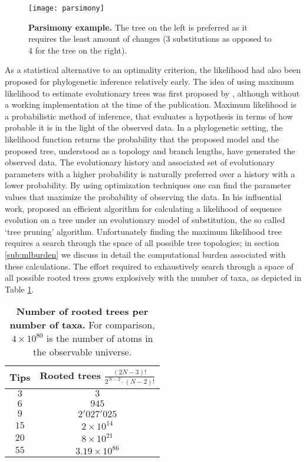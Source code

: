 \begin{figure}[H]
\centering
\texttt{[image: parsimony]} 
\caption{
{ \footnotesize 
{\bf Parsimony example.} The tree on the left is preferred as it requires the least amount of changes (3 substitutions as opposed to 4 for the tree on the right).
}%
}
\label{fig:parsimony}
\end{figure}

As a statistical alternative to an optimality criterion, the likelihood had also been proposed for phylogenetic inference relatively early.
The idea of using maximum likelihood to estimate evolutionary trees was first proposed by \cite{Edwards1964}, although without a working implementation at the time of the publication.
Maximum likelihood is a probabilistic method of inference, that evaluates a hypothesis in terms of how probable it is in the light of the observed data.
In a phylogenetic setting, the likelihood function returns the probability that the proposed model and the proposed tree, understood as a topology and branch lengths, have generated the observed data.
The evolutionary history and associated set of evolutionary parameters with a higher probability is naturally preferred over a history with a lower probability.
By using optimization techniques one can find the parameter values that maximize the probability of observing the data.
In his influential work, \cite{Felsenstein1981} proposed an efficient algorithm for calculating a likelihood of sequence evolution on a tree under an evolutionary model of substitution, the so called `tree pruning' algorithm.
Unfortunately finding the maximum likelihood tree requires a search through the space of all possible tree topologies; in section \ref{sub:mlburden} we discuss in detail the computational burden associated with these calculations.
The effort required to exhaustively search through a space of all possible rooted trees grows explosively with the number of taxa, as depicted in Table \ref{tab:maxLikeBurden}.

\begin{table}[H]
\centering
\begin{tabular}{cc}
\hline 
Tips & Rooted trees $\frac{(2N-3)!}{2^{N-2}\cdot(N-2)!}$ \tabularnewline
\hline 
\rowcolor{gray1}
$3$ & $3$\tabularnewline
$6$ & $945$\tabularnewline
\rowcolor{gray1}
$9$ & $2'027'025$\tabularnewline
$15$ & $2\times10^{14}$\tabularnewline
\rowcolor{gray1}
$20$ & $8\times10^{21}$\tabularnewline
$55$ & $3.19\times10^{86}$\tabularnewline
\end{tabular}
\caption{
{ \footnotesize 
{\bf{Number of rooted trees per number of taxa.}} For comparison, $4 \times 10^{80} $ is the number of atoms in the observable universe.
}%
}
\label{tab:maxLikeBurden}
\end{table}

